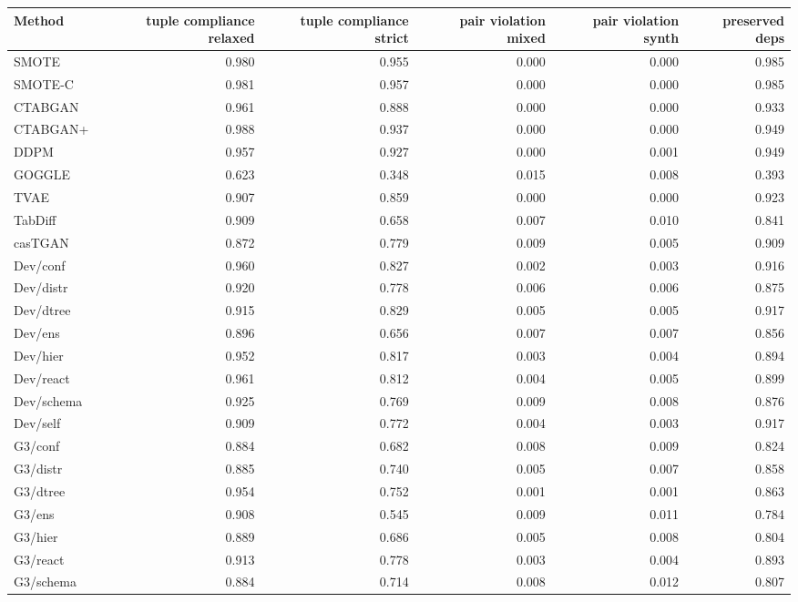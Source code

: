 \begin{table}[t]
\centering
\scriptsize
\setlength\tabcolsep{3pt}
\begin{tabular}{lrrrrr}
\toprule
\textbf{Method} & \textbf{tuple compliance relaxed} & \textbf{tuple compliance strict} & \textbf{pair violation mixed} & \textbf{pair violation synth} & \textbf{preserved deps} \\
\midrule
SMOTE & 0.980 & 0.955 & 0.000 & 0.000 & 0.985 \\
SMOTE-C & 0.981 & 0.957 & 0.000 & 0.000 & 0.985 \\
\midrule
CTABGAN & 0.961 & 0.888 & 0.000 & 0.000 & 0.933 \\
CTABGAN+ & 0.988 & 0.937 & 0.000 & 0.000 & 0.949 \\
DDPM & 0.957 & 0.927 & 0.000 & 0.001 & 0.949 \\
GOGGLE & 0.623 & 0.348 & 0.015 & 0.008 & 0.393 \\
TVAE & 0.907 & 0.859 & 0.000 & 0.000 & 0.923 \\
TabDiff & 0.909 & 0.658 & 0.007 & 0.010 & 0.841 \\
casTGAN & 0.872 & 0.779 & 0.009 & 0.005 & 0.909 \\
\midrule
Dev/conf & 0.960 & 0.827 & 0.002 & 0.003 & 0.916 \\
Dev/distr & 0.920 & 0.778 & 0.006 & 0.006 & 0.875 \\
Dev/dtree & 0.915 & 0.829 & 0.005 & 0.005 & 0.917 \\
Dev/ens & 0.896 & 0.656 & 0.007 & 0.007 & 0.856 \\
Dev/hier & 0.952 & 0.817 & 0.003 & 0.004 & 0.894 \\
Dev/react & 0.961 & 0.812 & 0.004 & 0.005 & 0.899 \\
Dev/schema & 0.925 & 0.769 & 0.009 & 0.008 & 0.876 \\
Dev/self & 0.909 & 0.772 & 0.004 & 0.003 & 0.917 \\
G3/conf & 0.884 & 0.682 & 0.008 & 0.009 & 0.824 \\
G3/distr & 0.885 & 0.740 & 0.005 & 0.007 & 0.858 \\
G3/dtree & 0.954 & 0.752 & 0.001 & 0.001 & 0.863 \\
G3/ens & 0.908 & 0.545 & 0.009 & 0.011 & 0.784 \\
G3/hier & 0.889 & 0.686 & 0.005 & 0.008 & 0.804 \\
G3/react & 0.913 & 0.778 & 0.003 & 0.004 & 0.893 \\
G3/schema & 0.884 & 0.714 & 0.008 & 0.012 & 0.807 \\

\end{tabular}
\end{table}
